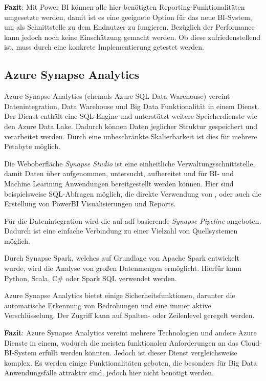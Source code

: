 \textbf{Fazit}: Mit Power BI können alle hier benötigten Reporting-Funktionalitäten umgesetzte werden, damit ist es eine geeignete Option für das neue BI-System, um als Schnittstelle zu dem Endnutzer zu fungieren. Bezüglich der Performance kann jedoch noch keine Einschätzung gemacht werden. Ob diese zufriedenstellend ist, muss durch eine konkrete Implementierung getestet werden.


\subsection{Azure Synapse Analytics} \label{sec:grundlagen:azure_dienste:synapseAnalytics}
Azure Synapse Analytics (ehemals Azure SQL Data Warehouse) vereint Datenintegration, Data Warehouse und Big Data Funktionalität in einem Dienst. Der Dienst enthält eine SQL-Engine und unterstützt weitere Speicherdienste wie den Azure Data Lake. Dadurch können Daten jeglicher Struktur gespeichert und verarbeitet werden. Durch eine unbeschränkte Skalierbarkeit ist dies für mehrere Petabyte möglich.

Die Weboberfläche \textit{Synapse Studio} ist eine einheitliche Verwaltungsschnittstelle, damit Daten über aufgenommen, untersucht, aufbereitet und für BI- und Machine Learining Anwendungen bereitgestellt werden können. Hier sind beispielsweise SQL-Abfragen möglich, die direkte Verwendung von , oder auch die Erstellung von PowerBI Visualisierungen und Reports.

Für die Datenintegration wird die auf \ac{adf} basierende \textit{Synapse Pipeline} angeboten. Dadurch ist eine einfache Verbindung zu einer Vielzahl von Quellsystemen möglich.

Durch Synapse Spark, welches auf Grundlage von Apache Spark entwickelt wurde, wird die Analyse von großen Datenmengen ermöglicht. Hierfür kann Python, Scala, C\# oder Spark SQL verwendet werden.

Azure Synapse Analytics bietet einige Sicherheitsfunktionen, darunter die automatische Erkennung von Bedrohungen und eine immer aktive Verschlüsselung. Der Zugriff kann auf Spalten- oder Zeilenlevel geregelt werden.
\cite{shiyal_beginning_2021}

\textbf{Fazit}: Azure Synapse Analytics vereint mehrere Technologien und andere Azure Dienste in einem, wodurch die meisten funktionalen Anforderungen an das Cloud-BI-System erfüllt werden könnten. Jedoch ist dieser Dienst vergleichsweise komplex. Es werden einige Funktionalitäten geboten, die besonders für Big Data Anwendungsfälle attraktiv sind, jedoch hier nicht benötigt werden.


